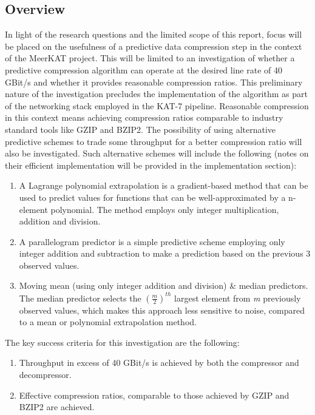 \subsection{Overview}
In light of the research questions and the limited scope of this report, focus will be placed on the usefulness of a predictive data compression 
step in the context of the MeerKAT project. This will be limited to an investigation of whether a predictive compression algorithm can operate at the desired 
line rate of 40 GBit/s and whether it provides reasonable compression ratios. This preliminary nature of the investigation precludes the implementation of the 
algorithm as part of the networking stack employed in the KAT-7 pipeline. Reasonable compression in this context means achieving compression ratios comparable 
to industry standard tools like GZIP and BZIP2. The possibility of using alternative predictive schemes to trade some throughput for a better compression ratio will also be investigated.
Such alternative schemes will include the following (notes on their efficient implementation will be provided in the implementation section):
\begin{enumerate}
 \item A Lagrange polynomial extrapolation is a gradient-based method that can be used to predict values for functions that can be well-approximated by a n-element polynomial. 
 The method employs only integer multiplication, addition and division.
 \item A parallelogram predictor is a simple predictive scheme employing only integer addition and subtraction to make a prediction based on the previous 3 observed values.
 \item Moving mean (using only integer addition and division) \& median predictors. The median predictor selects the $\left(\frac{m}{2}\right)^{th}$ largest element from \textit{m} previously observed
 values, which makes this approach less sensitive to noise, compared to a mean or polynomial extrapolation method.
\end{enumerate}
The key success criteria for this investigation are the following:
\begin{enumerate}
 \item Throughput in excess of 40 GBit/s is achieved by both the compressor and decompressor.
 \item Effective compression ratios, comparable to those achieved by GZIP and BZIP2 are achieved.
\end{enumerate}
